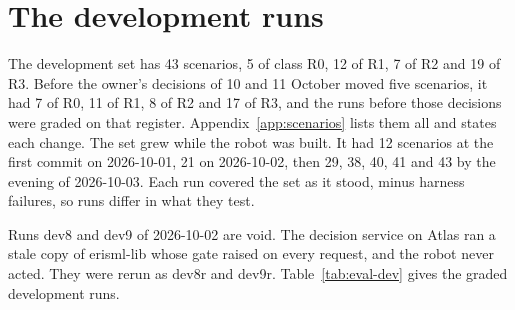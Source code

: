 \section{The development runs}\label{sec:eval-dev}

The development set has 43 scenarios, 5 of class R0, 12 of R1, 7 of R2 and 19 of R3.
Before the owner's decisions of 10 and 11 October moved five scenarios, it had 7 of R0, 11 of R1,
8 of R2 and 17 of R3, and the runs before those decisions were graded on that register.
Appendix~\ref{app:scenarios} lists them all and states each change.
The set grew while the robot was built.
It had 12 scenarios at the first commit on 2026-10-01, 21 on 2026-10-02, then 29, 38, 40, 41 and
43 by the evening of 2026-10-03.
Each run covered the set as it stood, minus harness failures, so runs differ in what they test.

Runs dev8 and dev9 of 2026-10-02 are void.
The decision service on Atlas ran a stale copy of erisml-lib whose gate raised on every request,
and the robot never acted.
They were rerun as dev8r and dev9r.
Table~\ref{tab:eval-dev} gives the graded development runs.

